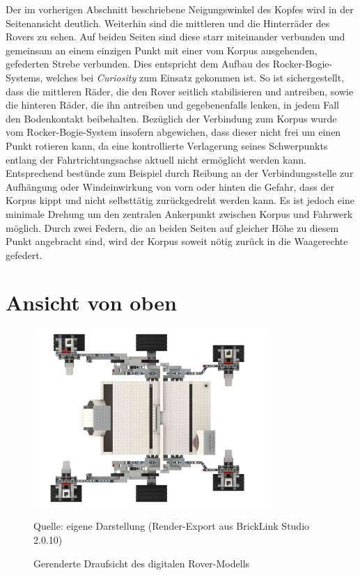 Der im vorherigen Abschnitt beschriebene Neigungswinkel des Kopfes wird in der Seitenansicht deutlich.
Weiterhin sind die mittleren und die Hinterräder des Rovers zu sehen.
Auf beiden Seiten sind diese starr miteinander verbunden und gemeinsam an einem einzigen Punkt mit einer vom Korpus ausgehenden, gefederten Strebe verbunden.
Dies entspricht dem Aufbau des Rocker-Bogie-Systems, welches bei \textit{Curiosity} zum Einsatz gekommen ist.
So ist sichergestellt, dass die mittleren Räder, die den Rover seitlich stabilisieren und antreiben, sowie die hinteren Räder, die ihn antreiben und gegebenenfalls lenken, in jedem Fall den Bodenkontakt beibehalten.
Bezüglich der Verbindung zum Korpus wurde vom Rocker-Bogie-System insofern abgewichen, dass dieser nicht frei um einen Punkt rotieren kann, da eine kontrollierte Verlagerung seines Schwerpunkts entlang der Fahrtrichtungsachse aktuell nicht ermöglicht werden kann.
Entsprechend bestünde zum Beispiel durch Reibung an der Verbindungsstelle zur Aufhängung oder Windeinwirkung von vorn oder hinten die Gefahr, dass der Korpus kippt und nicht selbsttätig zurückgedreht werden kann.
Es ist jedoch eine minimale Drehung um den zentralen Ankerpunkt zwischen Korpus und Fahrwerk möglich. 
Durch zwei Federn, die an beiden Seiten auf gleicher Höhe zu diesem Punkt angebracht sind, wird der Korpus soweit nötig zurück in die Waagerechte gefedert.

\section{Ansicht von oben}
\label{sec:draufsicht}

\begin{figure}
	\centering
	\includegraphics[width=0.8\textwidth]{../Images/20200425_Mars_Rover_V5_top.png}
	\vspace{0.5em}
	\parbox[c]{0.8\linewidth}{\footnotesize
		\centering
		\vspace{1em}
		Quelle: eigene Darstellung (Render-Export aus BrickLink Studio 2.0.10)
	}
	\caption{Gerenderte Draufsicht des digitalen Rover-Modells}
	\label{fig:rovertoprender}
\end{figure}

